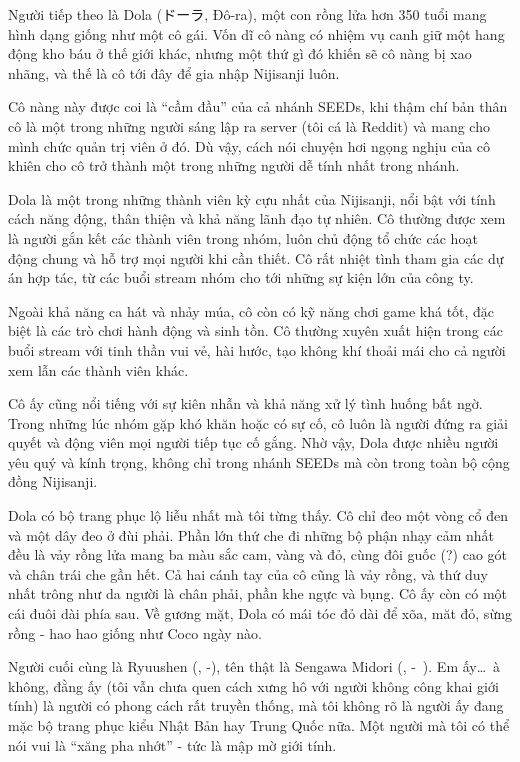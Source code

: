 \documentclass[../main.tex]{subfiles}
\begin{document}

Người tiếp theo là Dola (ドーラ, Đô-ra), một con rồng lửa hơn 350 tuổi mang hình dạng giống như một cô gái. Vốn dĩ cô nàng có nhiệm vụ canh giữ một hang động kho báu ở thế giới khác, nhưng một thứ gì đó khiến sẽ cô nàng bị xao nhãng, và thế là cô tới đây để gia nhập Nijisanji luôn.

Cô nàng này được coi là ``cầm đầu'' của cả nhánh SEEDs, khi thậm chí bản thân cô là một trong những người sáng lập ra server (tôi cá là Reddit) và mang cho mình chức quản trị viên ở đó. Dù vậy, cách nói chuyện hơi ngọng nghịu của cô khiên cho cô trở thành một trong những người dễ tính nhất trong nhánh.

Dola là một trong những thành viên kỳ cựu nhất của Nijisanji, nổi bật với tính cách năng động, thân thiện và khả năng lãnh đạo tự nhiên. Cô thường được xem là người gắn kết các thành viên trong nhóm, luôn chủ động tổ chức các hoạt động chung và hỗ trợ mọi người khi cần thiết. Cô rất nhiệt tình tham gia các dự án hợp tác, từ các buổi stream nhóm cho tới những sự kiện lớn của công ty.

Ngoài khả năng ca hát và nhảy múa, cô còn có kỹ năng chơi game khá tốt, đặc biệt là các trò chơi hành động và sinh tồn. Cô thường xuyên xuất hiện trong các buổi stream với tinh thần vui vẻ, hài hước, tạo không khí thoải mái cho cả người xem lẫn các thành viên khác.

Cô ấy cũng nổi tiếng với sự kiên nhẫn và khả năng xử lý tình huống bất ngờ. Trong những lúc nhóm gặp khó khăn hoặc có sự cố, cô luôn là người đứng ra giải quyết và động viên mọi người tiếp tục cố gắng. Nhờ vậy, Dola được nhiều người yêu quý và kính trọng, không chỉ trong nhánh SEEDs mà còn trong toàn bộ cộng đồng Nijisanji.

Dola có bộ trang phục lộ liễu nhất mà tôi từng thấy. Cô chỉ đeo một vòng cổ đen và một dây đeo ở đùi phải. Phần lớn thứ che đi những bộ phận nhạy cảm nhất đều là vảy rồng lửa mang ba màu sắc cam, vàng và đỏ, cùng đôi guốc (?) cao gót và chân trái che gần hết. Cả hai cánh tay của cô cũng là vảy rồng, và thứ duy nhất trông như da người là chân phải, phần khe ngực và bụng. Cô ấy còn có một cái đuôi dài phía sau. Về gương mặt, Dola có mái tóc đỏ dài để xõa, măt đỏ, sừng rồng - hao hao giống như Coco ngày nào.


Người cuối cùng là Ryuushen (, -), tên thật là Sengawa Midori (, -\ ). Em ấy\dots\ à không, đằng ấy (tôi vẫn chưa quen cách xưng hô với người không công khai giới tính) là người có phong cách rất truyền thống, mà tôi không rõ là người ấy đang mặc bộ trang phục kiểu Nhật Bản hay Trung Quốc nữa. Một người mà tôi có thể nói vui là ``xăng pha nhớt'' - tức là mập mờ giới tính.
\end{document}
